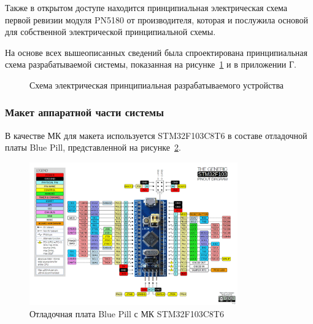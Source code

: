 Также в открытом доступе находится принципиальная электрическая схема первой ревизии модуля PN5180 от производителя, которая и послужила основой для собственной электрической принципиальной схемы\cite{pn5180_schematic}.


На основе всех вышеописанных сведений была спроектирована принципиальная схема разрабатываемой системы, показанная на рисунке~\ref{fig:principal_scheme} и в приложении Г.

\begin{figure}[H]
    \centering
    \caption{\centering Схема электрическая принципиальная разрабатываемого устройства}
    \label{fig:principal_scheme}
\end{figure}





\subsubsection{Макет аппаратной части системы}

В качестве МК для макета используется STM32F103C8T6 в составе отладочной платы Blue Pill, представленной на рисунке~\ref{fig:blue_pill}.

\begin{figure}[H]
    \centering
    \includegraphics[width=0.8\textwidth]{images/design/blue_pill}
    \caption{\centering Отладочная плата Blue Pill с МК STM32F103C8T6}
    \label{fig:blue_pill}
\end{figure}


